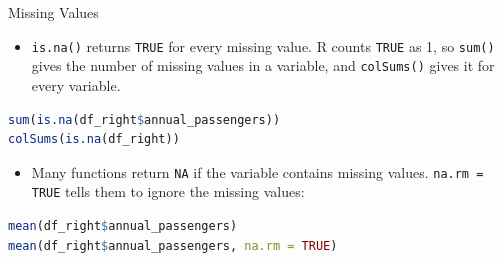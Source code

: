 \documentclass[9pt,aspectratio=169]{beamer}
\begin{document}
\begin{frame}[fragile]{Missing Values}

\begin{itemize}
  \item \texttt{is.na()} returns \texttt{TRUE} for every missing value. R counts \texttt{TRUE} as 1, so \texttt{sum()} gives the number of missing values in a variable, and \texttt{colSums()} gives it for every variable.
\end{itemize}
\begin{lstlisting}[language=R, basicstyle=\ttfamily\small]
sum(is.na(df_right$annual_passengers))
colSums(is.na(df_right))
\end{lstlisting}
\pause
\begin{itemize}
  \item Many functions return \texttt{NA} if the variable contains missing values. \texttt{na.rm = TRUE} tells them to ignore the missing values:
\end{itemize}
\begin{lstlisting}[language=R, basicstyle=\ttfamily\small]
mean(df_right$annual_passengers)
mean(df_right$annual_passengers, na.rm = TRUE)
\end{lstlisting}
\end{frame}
\end{document}
